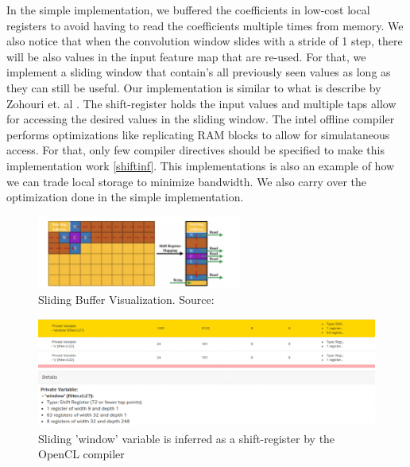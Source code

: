 In the simple implementation, we buffered the coefficients in low-cost local registers to avoid having to read the coefficients multiple times from memory. We also notice that when the convolution window slides with a stride of 1 step, there will be also values in the input feature map that are re-used. For that, we implement a sliding window that contain's all previously seen values as long as they can still be useful. Our implementation is similar to what is describe by Zohouri et. al \cite{2018combined}. The shift-register holds the input values and multiple taps allow for accessing the desired values in the sliding window. The intel offline compiler performs optimizations like replicating RAM blocks to allow for simulataneous access. For that, only few compiler directives should be specified to make this implementation work \ref{shiftinf}. This implementations is also an example of how we can trade local storage to minimize bandwidth. We also carry over the optimization done in the simple implementation.

\begin{figure}[h]
\centering
\includegraphics[width=0.6\textwidth]{Figures/slidingbuffer}
\decoRule
\caption[Sliding Buffer]{ Sliding Buffer Visualization. Source: \cite{2018combined}}
\label{fig:sliding buffer}
\end{figure}

\begin{figure}[h]
\centering
\includegraphics[width=1.0\textwidth]{Figures/shiftregister}
\decoRule
\caption[Shift Register]{ Sliding 'window' variable is inferred as a shift-register by the OpenCL compiler }
\label{fig:shiftregister}
\end{figure}

